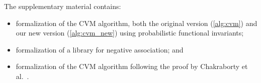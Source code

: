 The supplementary material contains:
\begin{itemize}
\item formalization of the CVM algorithm, both the original version (\cref{alg:cvm}) and our new version (\cref{alg:cvm_new}) using probabilistic functional invariants;
\item formalization of a library for negative association; and %
\item formalization of the CVM algorithm following the proof by Chakraborty et al.~\cite{chakraborty2022,chakraborty2023}.
\end{itemize}



